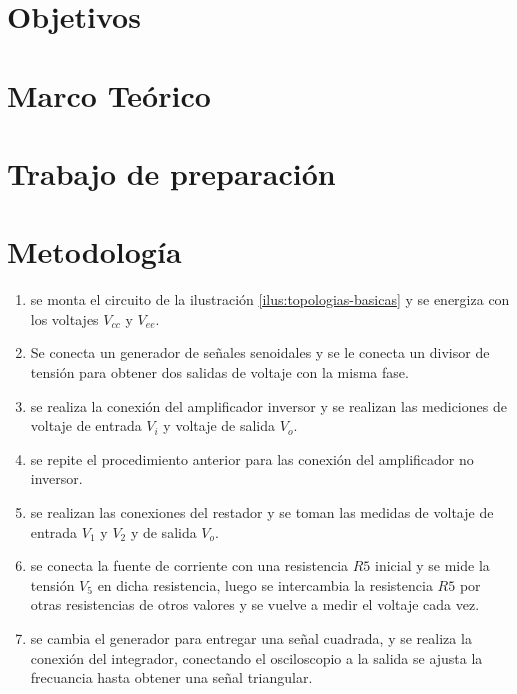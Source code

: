 \documentclass{article}
\begin{document}

\tableofcontents
\newpage

\section{Objetivos}



\section{Marco Teórico}



\section{Trabajo de preparación}



\FloatBarrier
\section{Metodología}

\begin{enumerate}
    \item se monta el circuito de la ilustración \ref{ilus:topologias-basicas} y se energiza con los voltajes $V_{cc}$ y $V_{ee}$. 
    \item Se conecta un generador de señales senoidales y se le conecta un divisor de tensión para obtener dos salidas de voltaje con la misma fase.
    \item  se realiza la conexión del amplificador inversor y se realizan las mediciones de voltaje de entrada $V_i$ y voltaje de salida $V_o$.
    \item se repite el procedimiento anterior para las conexión del amplificador no inversor.
    \item se realizan las conexiones del restador y se toman las medidas de voltaje de entrada $V_1$ y $V_2$ y de salida $V_o$.
    \item se conecta la fuente de corriente con una resistencia $R5$ inicial y se mide la tensión $V_5$ en dicha resistencia, luego se intercambia la resistencia $R5$ por otras resistencias de otros valores y se vuelve a medir el voltaje cada vez.
    \item se cambia el generador para entregar una señal cuadrada, y se realiza la conexión del integrador, conectando el osciloscopio a la salida se ajusta la frecuancia hasta obtener una señal triangular.
\end{enumerate}
\end{document}
